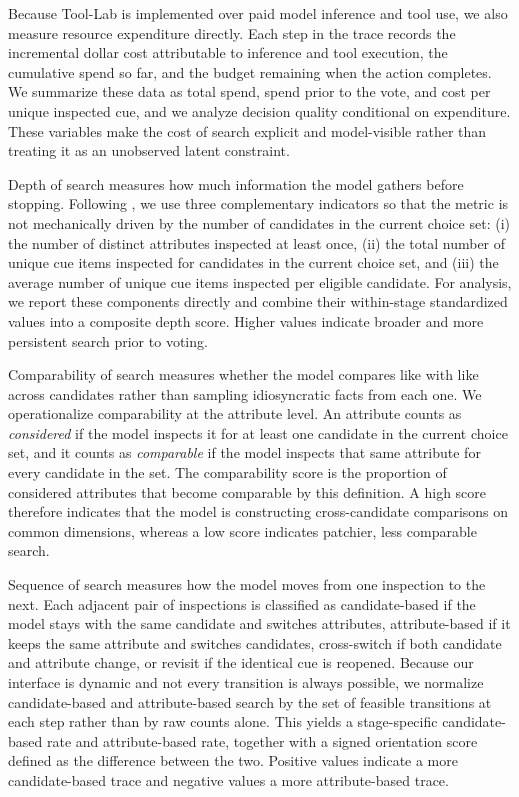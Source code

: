 Because Tool-Lab is implemented over paid model inference and tool use, we also
measure resource expenditure directly. Each step in the trace records the
incremental dollar cost attributable to inference and tool execution, the
cumulative spend so far, and the budget remaining when the action completes. We
summarize these data as total spend, spend prior to the vote, and cost per
unique inspected cue, and we analyze decision quality conditional on
expenditure. These variables make the cost of search explicit and model-visible
rather than treating it as an unobserved latent constraint.

Depth of search measures how much information the model gathers before
stopping. Following \citet{lau2006voters}, we use three complementary
indicators so that the metric is not mechanically driven by the number of
candidates in the current choice set: (i) the number of distinct attributes
inspected at least once, (ii) the total number of unique cue items inspected for
candidates in the current choice set, and (iii) the average number of unique
cue items inspected per eligible candidate. For analysis, we report these
components directly and combine their within-stage standardized values into a
composite depth score. Higher values indicate broader and more persistent
search prior to voting.

Comparability of search measures whether the model compares like with like
across candidates rather than sampling idiosyncratic facts from each one. We
operationalize comparability at the attribute level. An attribute counts as
\emph{considered} if the model inspects it for at least one candidate in the
current choice set, and it counts as \emph{comparable} if the model inspects
that same attribute for every candidate in the set. The comparability score is
the proportion of considered attributes that become comparable by this
definition. A high score therefore indicates that the model is constructing
cross-candidate comparisons on common dimensions, whereas a low score
indicates patchier, less comparable search.

Sequence of search measures how the model moves from one inspection to the
next. Each adjacent pair of inspections is classified as candidate-based if the
model stays with the same candidate and switches attributes, attribute-based if
it keeps the same attribute and switches candidates, cross-switch if both
candidate and attribute change, or revisit if the identical cue is reopened.
Because our interface is dynamic and not every transition is always possible,
we normalize candidate-based and attribute-based search by the set of feasible
transitions at each step rather than by raw counts alone. This yields a
stage-specific candidate-based rate and attribute-based rate, together with a
signed orientation score defined as the difference between the two. Positive
values indicate a more candidate-based trace and negative values a more
attribute-based trace.

